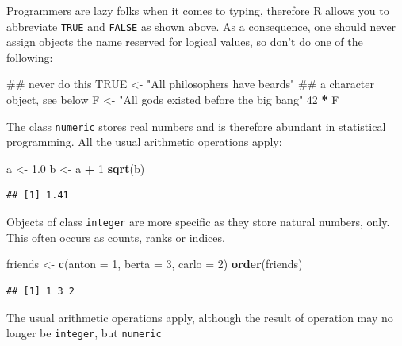 \documentclass[]{svmono}
\newenvironment{Shaded}{\begin{snugshade}}{\end{snugshade}}
\newcommand{\KeywordTok}[1]{\textcolor[rgb]{0.13,0.29,0.53}{\textbf{#1}}}
\newcommand{\DataTypeTok}[1]{\textcolor[rgb]{0.13,0.29,0.53}{#1}}
\newcommand{\DecValTok}[1]{\textcolor[rgb]{0.00,0.00,0.81}{#1}}
\newcommand{\FloatTok}[1]{\textcolor[rgb]{0.00,0.00,0.81}{#1}}
\newcommand{\StringTok}[1]{\textcolor[rgb]{0.31,0.60,0.02}{#1}}
\newcommand{\OtherTok}[1]{\textcolor[rgb]{0.56,0.35,0.01}{#1}}
\newcommand{\OperatorTok}[1]{\textcolor[rgb]{0.81,0.36,0.00}{\textbf{#1}}}
\newcommand{\NormalTok}[1]{#1}
\theoremstyle{definition}
\theoremstyle{definition}
\theoremstyle{definition}
\theoremstyle{remark}
\begin{document}
Programmers are lazy folks when it comes to typing, therefore R allows
you to abbreviate \texttt{TRUE} and \texttt{FALSE} as shown above. As a
consequence, one should never assign objects the name reserved for
logical values, so don't do one of the following:

\begin{Shaded}
\begin{Highlighting}[]
\NormalTok{## never do this}
\OtherTok{TRUE}\NormalTok{ <-}\StringTok{ "All philosophers have beards"}\NormalTok{ ## a character object, see below}
\NormalTok{F    <-}\StringTok{ "All gods existed before the big bang"}
\DecValTok{42} \OperatorTok{*}\StringTok{ }\NormalTok{F}
\end{Highlighting}
\end{Shaded}

The class \texttt{numeric} stores real numbers and is therefore abundant
in statistical programming. All the usual arithmetic operations apply:

\begin{Shaded}
\begin{Highlighting}[]
\NormalTok{a <-}\StringTok{ }\FloatTok{1.0}
\NormalTok{b <-}\StringTok{ }\NormalTok{a }\OperatorTok{+}\StringTok{ }\DecValTok{1}
\KeywordTok{sqrt}\NormalTok{(b)}
\end{Highlighting}
\end{Shaded}

\begin{verbatim}
## [1] 1.41
\end{verbatim}

Objects of class \texttt{integer} are more specific as they store
natural numbers, only. This often occurs as counts, ranks or indices.

\begin{Shaded}
\begin{Highlighting}[]
\NormalTok{friends <-}\StringTok{ }\KeywordTok{c}\NormalTok{(}\DataTypeTok{anton =} \DecValTok{1}\NormalTok{, }
             \DataTypeTok{berta =} \DecValTok{3}\NormalTok{, }
             \DataTypeTok{carlo =} \DecValTok{2}\NormalTok{)}
\KeywordTok{order}\NormalTok{(friends)}
\end{Highlighting}
\end{Shaded}

\begin{verbatim}
## [1] 1 3 2
\end{verbatim}

The usual arithmetic operations apply, although the result of operation
may no longer be \texttt{integer}, but \texttt{numeric}
\end{document}
